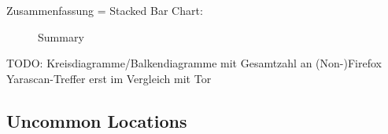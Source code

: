 Zusammenfassung = Stacked Bar Chart:
\begin{figure}[h!]
	\centerline{}
	\label{chart:final-criteria}  
	\caption{Summary}
\end{figure}

TODO: Kreisdiagramme/Balkendiagramme mit Gesamtzahl an (Non-)Firefox Yarascan-Treffer erst im Vergleich mit Tor

\subsection*{Uncommon Locations}

